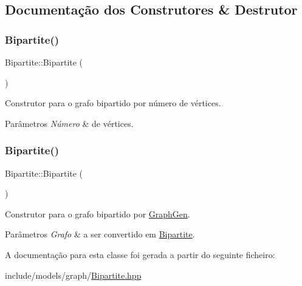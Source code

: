 \subsection{Documentação dos Construtores \& Destrutor}
\mbox{\label{classBipartite_a1dfec46c393c2c1b8141250d26968673}} 
\subsubsection{\texorpdfstring{Bipartite()}{Bipartite()}\hspace{0.1cm}{\footnotesize\ttfamily [1/2]}}
{\footnotesize\ttfamily Bipartite\+::\+Bipartite (\begin{DoxyParamCaption}\item[{int}]{ }\end{DoxyParamCaption})}

Construtor para o grafo bipartido por número de vértices. 
\begin{DoxyParams}{Parâmetros}
{\em Número} & de vértices. \\
\hline
\end{DoxyParams}
\mbox{\label{classBipartite_a5535fa6da516192c5ec964b37db63e55}} 
\subsubsection{\texorpdfstring{Bipartite()}{Bipartite()}\hspace{0.1cm}{\footnotesize\ttfamily [2/2]}}
{\footnotesize\ttfamily Bipartite\+::\+Bipartite (\begin{DoxyParamCaption}\item[{\hyperlink{classGraphGen}{Graph\+Gen} \&}]{ }\end{DoxyParamCaption})}

Construtor para o grafo bipartido por \hyperlink{classGraphGen}{Graph\+Gen}. 
\begin{DoxyParams}{Parâmetros}
{\em Grafo} & a ser convertido em \hyperlink{classBipartite}{Bipartite}. \\
\hline
\end{DoxyParams}


A documentação para esta classe foi gerada a partir do seguinte ficheiro\+:\begin{DoxyCompactItemize}
\item 
include/models/graph/\hyperlink{Bipartite_8hpp}{Bipartite.\+hpp}\end{DoxyCompactItemize}
